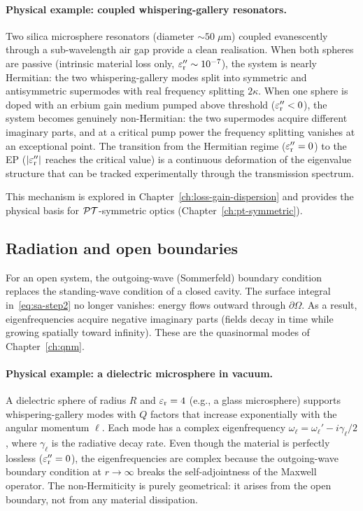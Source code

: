 \paragraph{Physical example: coupled whispering-gallery resonators.}
Two silica microsphere resonators (diameter $\sim 50\;\mu$m) coupled
evanescently through a sub-wavelength air gap provide a clean realisation.
When both spheres are passive (intrinsic material loss only,
$\varepsilon_{\mathrm{r}}'' \sim 10^{-7}$), the system is nearly Hermitian: the two
whispering-gallery modes split into symmetric and antisymmetric
supermodes with real frequency splitting $2\kappa$. When one sphere is
doped with an erbium gain medium pumped above threshold ($\varepsilon_{\mathrm{r}}'' < 0$),
the system becomes genuinely non-Hermitian: the two supermodes acquire
different imaginary parts, and at a critical pump power the frequency
splitting vanishes at an exceptional point. The transition from the
Hermitian regime ($\varepsilon_{\mathrm{r}}'' = 0$) to the EP ($|\varepsilon_{\mathrm{r}}''|$ reaches the
critical value) is a continuous deformation of the eigenvalue structure
that can be tracked experimentally through the transmission spectrum.

This mechanism is explored in Chapter~\ref{ch:loss-gain-dispersion} and
provides the physical basis for $\mathcal{PT}$-symmetric optics
(Chapter~\ref{ch:pt-symmetric}).

\subsection{Radiation and open boundaries}
\label{ssec:road-radiation}

For an open system, the outgoing-wave (Sommerfeld) boundary condition
replaces the standing-wave condition of a closed cavity. The surface
integral in~\eqref{eq:sa-step2} no longer vanishes: energy flows outward
through $\partial\Omega$. As a result, eigenfrequencies acquire negative
imaginary parts (fields decay in time while growing spatially toward
infinity). These are the quasinormal modes of Chapter~\ref{ch:qnm}.

\paragraph{Physical example: a dielectric microsphere in vacuum.}
A dielectric sphere of radius $R$ and $\varepsilon_{\mathrm{r}} = 4$ (e.g., a glass
microsphere) supports whispering-gallery modes with $Q$ factors that
increase exponentially with the angular momentum $\ell$. Each mode has
a complex eigenfrequency $\omega_\ell = \omega_\ell' - i\gamma_\ell/2$,
where $\gamma_\ell$ is the radiative decay rate. Even though the
material is perfectly lossless ($\varepsilon_{\mathrm{r}}'' = 0$), the eigenfrequencies are
complex because the outgoing-wave boundary condition at $r \to \infty$
breaks the self-adjointness of the Maxwell operator. The non-Hermiticity
is purely geometrical: it arises from the open boundary, not from any
material dissipation.

